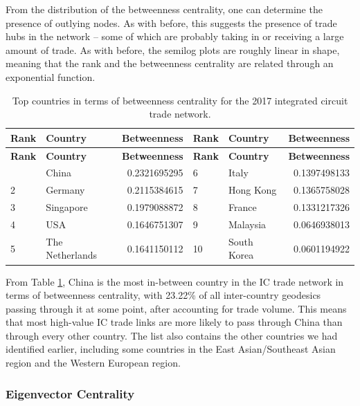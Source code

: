 \documentclass[12pt,letterpaper]{report}
\begin{document}
			From the distribution of the betweenness centrality, one can determine the presence of outlying nodes. As with before, this suggests the presence of trade hubs in the network – some of which are probably taking in or receiving a large amount of trade. As with before, the semilog plots are roughly linear in shape, meaning that the rank and the betweenness centrality are related through an exponential function.
			
			\begin{longtable}{|l|l|r|l|l|r|}
				\caption{Top countries in terms of betweenness centrality for the 2017 integrated circuit trade network. \label{tab:tab03TopBetweenness}} \\
				\hline
				\textbf{\small Rank} & \textbf{\small Country} & \textbf{\small Betweenness} & \textbf{\small Rank} &
				\textbf{\small Country} & \textbf{\small Betweenness} \\ 
				\hline
				\endfirsthead
				\hline
				\textbf{\small Rank} & \textbf{\small Country} & \textbf{\small Betweenness} & \textbf{\small Rank} &
				\textbf{\small Country} & \textbf{\small Betweenness} \\ 
				\hline
				\endhead
				\hline
				\endfoot
				1 & China & 0.2321695295 & 6 & Italy & 0.1397498133 \\
				2 & Germany & 0.2115384615 & 7 & Hong Kong & 0.1365758028 \\
				3 & Singapore & 0.1979088872 & 8 & France & 0.1331217326 \\
				4 & USA & 0.1646751307 & 9 & Malaysia & 0.0646938013 \\
				5 & The Netherlands & 0.1641150112 & 10 & South Korea & 0.0601194922 \\
			\end{longtable}
			
			From Table \ref{tab:tab03TopBetweenness}, China is the most in-between country in the IC trade network in terms of betweenness centrality, with 23.22\% of all inter-country geodesics passing through it at some point, after accounting for trade volume. This means that most high-value IC trade links are more likely to pass through China than through every other country.
			The list also contains the other countries we had identified earlier, including some countries in the East Asian/Southeast Asian region and the Western European region.
			
			\subsubsection{Eigenvector Centrality}
			\label{ssec:5224eigenvector}
			
\end{document}
